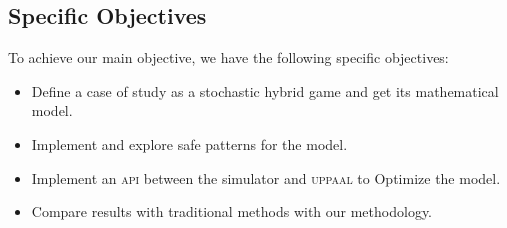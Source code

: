         \subsection*{Specific Objectives}
        To achieve our main objective, we have the following specific objectives:
        \begin{itemize}
            \item Define a case of study as a stochastic hybrid game and get its mathematical model.
            \item Implement and explore safe patterns for the model.
            \item Implement an \textsc{api} between the simulator and \textsc{uppaal} to Optimize the model.
            \item Compare results with traditional methods with our methodology.
        \end{itemize}


